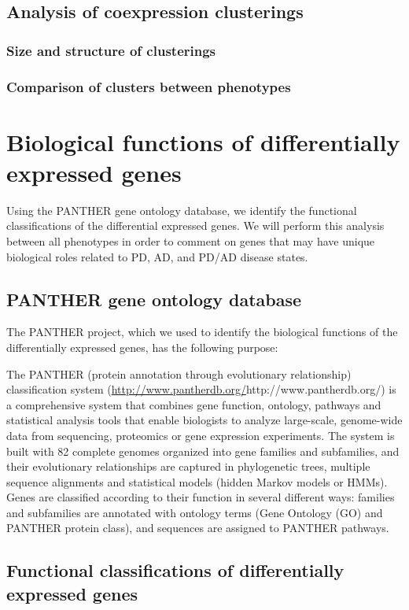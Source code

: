 \subsection{Analysis of coexpression clusterings}
\label{subsec:analys-coexpr-clust}

\subsubsection{Size and structure of clusterings}
\label{subsec:size-struct-clust}

\subsubsection{Comparison of clusters between phenotypes}
\label{subsec:comp-clust-betw}


\section{Biological functions of differentially expressed genes}
\label{sec:biol-funct-diff}

Using the PANTHER gene ontology database, we identify the functional classifications of the differential expressed genes. We will perform this analysis between all phenotypes in order to comment on genes that may have unique biological roles related to PD, AD, and PD/AD disease states.


\subsection{PANTHER gene ontology database}
\label{subsec:panth-gene-ontol}

The PANTHER project, which we used to identify the biological functions of the differentially expressed genes, has the following purpose\cite{PANTHER}:\\

\begin{blockquote}
  The PANTHER (protein annotation through evolutionary relationship) classification system (\url{http://www.pantherdb.org/}{http://www.pantherdb.org/}) is a comprehensive system that combines gene function, ontology, pathways and statistical analysis tools that enable biologists to analyze large-scale, genome-wide data from sequencing, proteomics or gene expression experiments. The system is built with 82 complete genomes organized into gene families and subfamilies, and their evolutionary relationships are captured in phylogenetic trees, multiple sequence alignments and statistical models (hidden Markov models or HMMs). Genes are classified according to their function in several different ways: families and subfamilies are annotated with ontology terms (Gene Ontology (GO) and PANTHER protein class), and sequences are assigned to PANTHER pathways.
\end{blockquote}

\subsection{Functional classifications of differentially expressed genes}
\label{subsec:funct-class-diff}


\pagebreak






